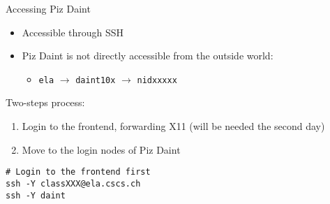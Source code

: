 \begin{frame}[fragile]{Accessing Piz Daint}
  \begin{itemize}
  \item Accessible through SSH
  \item Piz Daint is not directly accessible from the outside world:
    \begin{itemize}
    \item \texttt{ela} $\rightarrow$ \texttt{daint10x} $\rightarrow$ \texttt{nidxxxxx}
    \end{itemize}
  \end{itemize}

  Two-steps process:
  \begin{enumerate}
  \item Login to the frontend, forwarding X11 (will be needed the second day)
  \item Move to the login nodes of Piz Daint
  \end{enumerate}

  \vfill
  \begin{lstlisting}[style=console]
# Login to the frontend first
ssh -Y classXXX@ela.cscs.ch
ssh -Y daint
  \end{lstlisting}
\end{frame}
